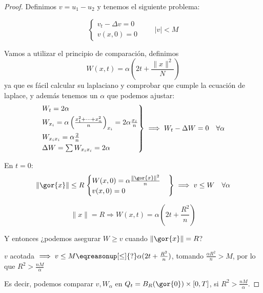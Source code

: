 			\begin{proof}
				Definimos $v = u_1 -u_2$ y tenemos el siguiente problema:

				\[\begin{cases}
					v_t - \Delta v = 0\\
					v(x,0) = 0
				\end{cases}  \quad\quad |v| < M\]

				Vamos a utilizar el principio de comparación, definimos
				\[ W(x,t) = \alpha \left(2t + \frac{\| x\|^2}{N} \right) \]
				ya que es fácil calcular su laplaciano y comprobar que cumple la ecuación de laplace, y además tenemos un $\alpha$ que podemos ajustar:
				\begin{gather*}
					\begin{rcases}
						W_t = 2\alpha\\
						W_{x_i} = \alpha \left(\frac{x_1^2 + \dots + x_n^2}{n} \right)_{x_i} = 2 \alpha \frac{x_i}{n} \\
						W_{x_i x_i} = \alpha \frac{2}{n}\\
						\Delta W = \sum W_{x_i x_i} = 2\alpha
					\end{rcases} \implies
					W_t - \Delta W = 0 \quad \forall \alpha
				\end{gather*}

				\begin{minipage}[m]{0.5 \textwidth}
				\end{minipage}
				\begin{minipage}[m]{0.5 \textwidth}
				\end{minipage}

				En $t=0$:
				\[ \|\gor{x}\| \leq R \left. \begin{cases}
					W(x,0) = \alpha \frac{\|\gor{x}\|^2}{n}\\
					v(x,0) = 0
				\end{cases}\right\} \implies v \leq W \quad \forall \alpha \]

				\[ \|x\| = R \Rightarrow W(x,t) = \alpha(2t+\frac{R^2}{n}) \]

				Y entonces ¿podemos asegurar $W \geq v$ cuando $\|\gor{x}\| = R$?

				$v$ acotada $\implies v \leq M \eqreasonup[\leq]{?} \alpha (2t + \frac{R^2}{n})$, tomando $\frac{\alpha R^2}{n} > M$, por lo que $R^2 > \frac{nM}{\alpha}$

				Es decir, podemos comparar $v, W_\alpha$ en $Q_t = B_R(\gor{0}) \times [0,T]$, si $R^2 > \frac{nM}{\alpha}$.


\end{proof}
